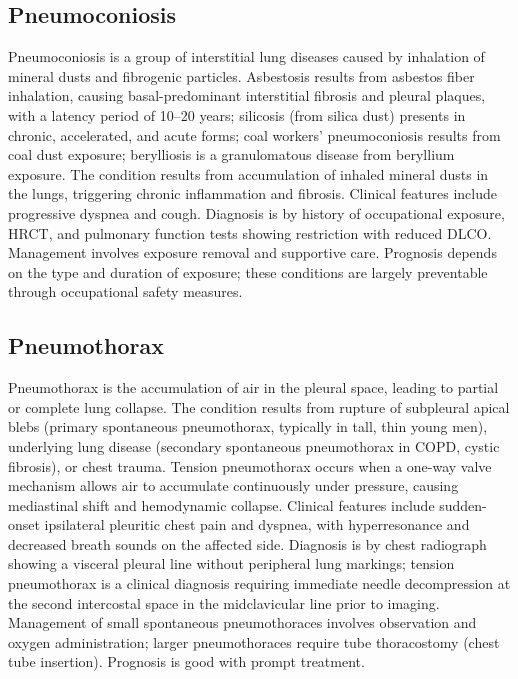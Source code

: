 \subsection{Pneumoconiosis}
\label{sec:Pneumoconiosis}
Pneumoconiosis is a group of interstitial lung diseases caused by inhalation of mineral dusts and fibrogenic particles. Asbestosis results from asbestos fiber inhalation, causing basal-predominant interstitial fibrosis and pleural plaques, with a latency period of 10--20 years; silicosis (from silica dust) presents in chronic, accelerated, and acute forms; coal workers' pneumoconiosis results from coal dust exposure; berylliosis is a granulomatous disease from beryllium exposure. The condition results from accumulation of inhaled mineral dusts in the lungs, triggering chronic inflammation and fibrosis. Clinical features include progressive dyspnea and cough. Diagnosis is by history of occupational exposure, HRCT, and pulmonary function tests showing restriction with reduced DLCO. Management involves exposure removal and supportive care. Prognosis depends on the type and duration of exposure; these conditions are largely preventable through occupational safety measures.

\subsection{Pneumothorax}
\label{sec:Pneumothorax}

Pneumothorax is the accumulation of air in the pleural space, leading to partial or complete lung collapse. The condition results from rupture of subpleural apical blebs (primary spontaneous pneumothorax, typically in tall, thin young men), underlying lung disease (secondary spontaneous pneumothorax in COPD, cystic fibrosis), or chest trauma. Tension pneumothorax occurs when a one-way valve mechanism allows air to accumulate continuously under pressure, causing mediastinal shift and hemodynamic collapse. Clinical features include sudden-onset ipsilateral pleuritic chest pain and dyspnea, with hyperresonance and decreased breath sounds on the affected side. Diagnosis is by chest radiograph showing a visceral pleural line without peripheral lung markings; tension pneumothorax is a clinical diagnosis requiring immediate needle decompression at the second intercostal space in the midclavicular line prior to imaging. Management of small spontaneous pneumothoraces involves observation and oxygen administration; larger pneumothoraces require tube thoracostomy (chest tube insertion). Prognosis is good with prompt treatment.

